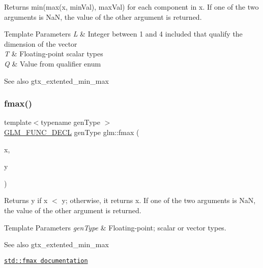 Returns min(max(x, min\+Val), max\+Val) for each component in x. If one of the two arguments is NaN, the value of the other argument is returned.


\begin{DoxyTemplParams}{Template Parameters}
{\em L} & Integer between 1 and 4 included that qualify the dimension of the vector \\
\hline
{\em T} & Floating-\/point scalar types \\
\hline
{\em Q} & Value from qualifier enum\\
\hline
\end{DoxyTemplParams}
\begin{DoxySeeAlso}{See also}
gtx\+\_\+extented\+\_\+min\+\_\+max 
\end{DoxySeeAlso}
\mbox{\label{group__gtx__extended__min__max_gae5792cb2b51190057e4aea027eb56f81}} 
\subsubsection{\texorpdfstring{fmax()}{fmax()}\hspace{0.1cm}{\footnotesize\ttfamily [1/3]}}
{\footnotesize\ttfamily template$<$typename gen\+Type $>$ \\
\hyperlink{setup_8hpp_ab2d052de21a70539923e9bcbf6e83a51}{G\+L\+M\+\_\+\+F\+U\+N\+C\+\_\+\+D\+E\+CL} gen\+Type glm\+::fmax (\begin{DoxyParamCaption}\item[{gen\+Type}]{x,  }\item[{gen\+Type}]{y }\end{DoxyParamCaption})}

Returns y if x $<$ y; otherwise, it returns x. If one of the two arguments is NaN, the value of the other argument is returned.


\begin{DoxyTemplParams}{Template Parameters}
{\em gen\+Type} & Floating-\/point; scalar or vector types.\\
\hline
\end{DoxyTemplParams}
\begin{DoxySeeAlso}{See also}
gtx\+\_\+extented\+\_\+min\+\_\+max 

\href{http://en.cppreference.com/w/cpp/numeric/math/fmax}{\tt std\+::fmax documentation} 
\end{DoxySeeAlso}
\mbox{\label{group__gtx__extended__min__max_gab380df808a15a6a23993e3475d1b94d2}} 
